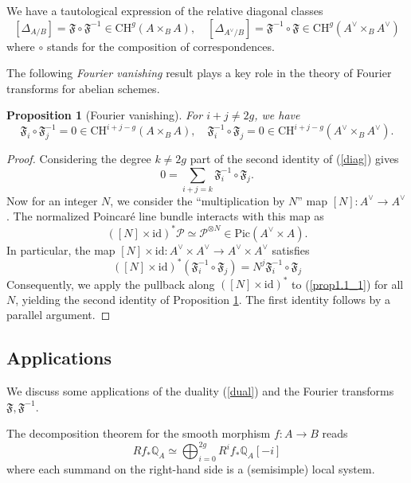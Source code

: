 \documentclass[11pt]{amsart}
\theoremstyle{plain}
\newtheorem{prop}[thm]{Proposition}
\theoremstyle{definition}
\theoremstyle{remark}
\newcommand{\BQ}{{\mathbb{Q}}}
\newcommand{\CP}{{\mathcal P}}
\begin{document}
We have a tautological expression of the relative diagonal classes
\begin{equation}\label{diag}
[\Delta_{A/B}] = \mathfrak{F} \circ \mathfrak{F}^{-1} \in \mathrm{CH}^g(A \times_B A), \quad [\Delta_{A^\vee/B}] = \mathfrak{F}^{-1} \circ \mathfrak{F} \in \mathrm{CH}^g(A^\vee\times_B A^\vee)
\end{equation}
where $\circ$ stands for the composition of correspondences.

The following \emph{Fourier vanishing} result plays a key role in the theory of Fourier transforms for abelian schemes.

\begin{prop}[Fourier vanishing] \label{prop1.1}
For $i+j \neq 2g$, we have
\[
\mathfrak{F}_i\circ \mathfrak{F}^{-1}_{j}=0 \in \mathrm{CH}^{i+j-g}(A \times_B A), \quad \mathfrak{F}^{-1}_i \circ \mathfrak{F}_j = 0 \in \mathrm{CH}^{i+j-g}(A^\vee\times_B A^\vee).
\]
\end{prop}

\begin{proof}
Considering the degree $k\neq 2g$ part of the second identity of (\ref{diag}) gives
\begin{equation}\label{prop1.1_1}
0 = \sum_{i+j=k} \mathfrak{F}^{-1}_i\circ \mathfrak{F}_{j}.
\end{equation}
Now for an integer $N$, we consider the ``multiplication by $N$'' map $[N]: A^\vee \to A^\vee$. The normalized Poincar\'e line bundle interacts with this map as
\[
\left([N] \times \mathrm{id}\right)^* \CP \simeq \CP^{\otimes N} \in \mathrm{Pic}\left( A^\vee \times A \right).
\]
In particular, the map $[N]\times \mathrm{id}: A^\vee\times A^\vee \to A^\vee\times A^\vee$ satisfies
\[
([N] \times \mathrm{id})^* \left( \mathfrak{F}^{-1}_i\circ \mathfrak{F}_j\right) = N^j\mathfrak{F}^{-1}_i\circ \mathfrak{F}_j
\]
Consequently, we apply the pullback along $([N] \times \mathrm{id})^*$ to (\ref{prop1.1_1}) for all $N$, yielding the second identity of Proposition \ref{prop1.1}. The first identity follows by a parallel argument.
\end{proof}


\subsection{Applications}
We discuss some applications of the duality (\ref{dual}) and the Fourier transforms $\mathfrak{F}, \mathfrak{F}^{-1}$. 

The decomposition theorem for the smooth morphism $f: A \to B$ reads
\begin{equation}\label{thm1.3_1}
Rf_* \BQ_A \simeq \bigoplus_{i=0}^{2g} R^if_* \BQ_A [-i]
\end{equation}
where each summand on the right-hand side is a (semisimple) local system.
\end{document}
